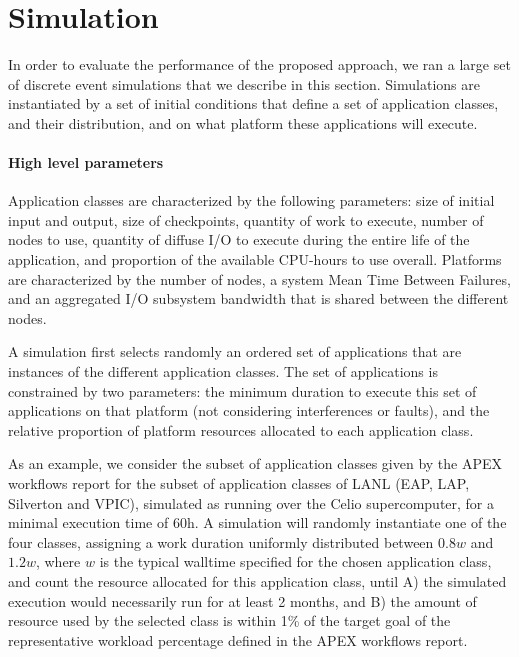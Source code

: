 \documentclass[conference]{IEEEtran}
\begin{document}
\section{Simulation}\label{sec:simulator}

In order to evaluate the performance of the proposed approach, we
ran a large set of discrete event simulations that we describe in this
section. Simulations are instantiated by a set of initial conditions
that define a set of application classes, and their distribution, and
on what platform these applications will execute.

\paragraph*{High level parameters}
Application classes are characterized by the following parameters:
size of initial input and output, size of checkpoints, quantity of
work to execute, number of nodes to use, quantity of diffuse I/O to
execute during the entire life of the application, and proportion of
the available CPU-hours to use overall.  Platforms are characterized
by the number of nodes, a system Mean Time Between Failures, and an
aggregated I/O subsystem bandwidth that is shared between the
different nodes.

A simulation first selects randomly an ordered set of applications
that are instances of the different application classes. The set of
applications is constrained by two parameters: the minimum duration to
execute this set of applications on that platform (not considering
interferences or faults), and the relative proportion of platform
resources allocated to each application class.

As an example, we consider the subset of application classes given by
the APEX workflows report for the subset of application classes of
LANL (EAP, LAP, Silverton and VPIC), simulated as running over the
Celio supercomputer, for a minimal execution time of 60h. A simulation
will randomly instantiate one of the four classes, assigning a work
duration uniformly distributed between $0.8w$ and $1.2w$, where $w$ is
the typical walltime specified for the chosen application class, and
count the resource allocated for this application class, until A) the
simulated execution would necessarily run for at least 2 months, and B) the
amount of resource used by the selected class is within 1\% of the
target goal of the representative workload percentage defined in the
APEX workflows report.
\end{document}
